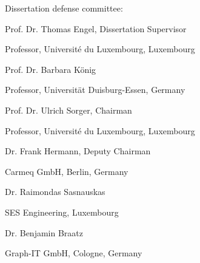 \begin{minipage}{\textwidth}
    \vspace*{2cm}
\raggedright{
    \Large{Dissertation defense committee:}\par
    \vspace*{0.5cm}
    \Large{Prof. Dr. Thomas Engel, Dissertation Supervisor}\par
    \normalsize{Professor, Universit\'e du Luxembourg, Luxembourg}\par
    \vspace*{.1cm}
    \Large{Prof. Dr. Barbara K\"onig}\par
    \normalsize{Professor, Universit\"at Duisburg-Essen, Germany}\par
    \vspace*{.1cm}
    \Large{Prof. Dr. Ulrich Sorger, Chairman}\par
    \normalsize{Professor, Universit\'e du Luxembourg, Luxembourg}\par
    \vspace*{.1cm}
    \Large{Dr. Frank Hermann, Deputy Chairman}\par
    \normalsize{Carmeq GmbH, Berlin, Germany}\par
    \vspace*{.1cm}
    \Large{Dr. Raimondas Sasnauskas}\par
    \normalsize{SES Engineering, Luxembourg}\par
    \vspace*{.1cm}
    \Large{Dr. Benjamin Braatz}\par
    \normalsize{Graph-IT GmbH, Cologne, Germany}\par
}

\end{minipage}
\clearpage
